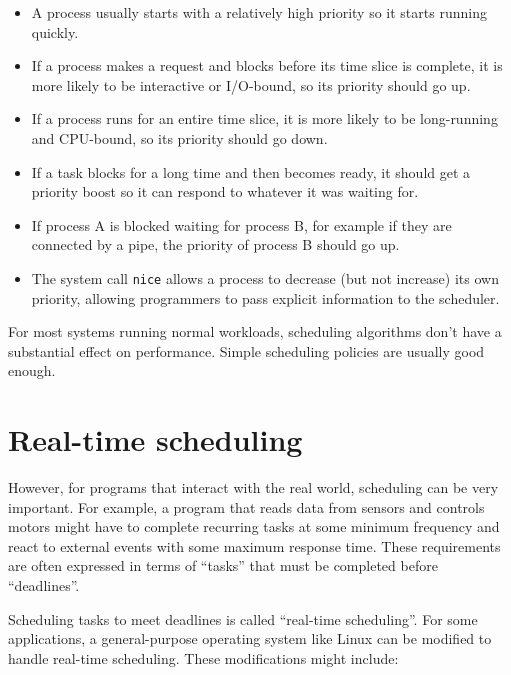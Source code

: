 \documentclass[12pt]{book}
\begin{document}
\begin{itemize}

\item A process usually starts with a relatively high priority so it
  starts running quickly.

\item If a process makes a request and blocks before its time slice is
  complete, it is more likely to be interactive or I/O-bound, so its
  priority should go up.

\item If a process runs for an entire time slice, it is more likely to
  be long-running and CPU-bound, so its priority should go down.

\item If a task blocks for a long time and then becomes ready, it
  should get a priority boost so it can respond to whatever it was
  waiting for.

\item If process A is blocked waiting for process B, for example if
  they are connected by a pipe, the priority of process B should go
  up.

\item The system call {\tt nice} allows a process to decrease (but not
  increase) its own priority, allowing programmers to pass explicit
  information to the scheduler.

\end{itemize}

For most systems running normal workloads, scheduling algorithms
don't have a substantial effect on performance.  Simple scheduling
policies are usually good enough.


\section{Real-time scheduling}

However, for programs that interact with the real world, scheduling
can be very important.  For example, a program that reads data from
sensors and controls motors might have to complete recurring tasks at
some minimum frequency and react to external events with some maximum
response time.  These requirements are often expressed in terms of
``tasks'' that must be completed before ``deadlines''.

Scheduling tasks to meet deadlines is called ``real-time
  scheduling''.  For some applications, a general-purpose operating
system like Linux can be modified to handle real-time scheduling.
These modifications might include:
\end{document}
